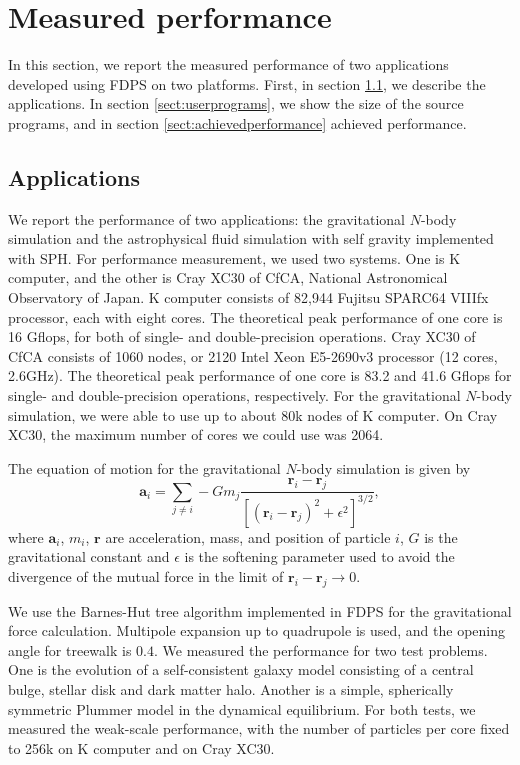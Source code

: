 \documentclass[dvipdfmx]{acm_proc_article-sp}
\begin{document}
\section{Measured performance}


In this section, we report
the measured
performance of two applications developed using FDPS on two
platforms. First, in  section \ref{sect:applications},
we describe the applications. In section
\ref{sect:userprograms}, we show the size of the source programs, and
in section \ref{sect:achievedperformance} achieved performance.



\subsection{Applications}
\label{sect:applications}

We report the performance of two applications: the gravitational
$N$-body simulation and the astrophysical fluid simulation with self
gravity implemented with SPH. For performance measurement, we used two
systems. One is K computer, and the other is Cray XC30 of CfCA,
National Astronomical Observatory of Japan. K computer consists of
82,944 Fujitsu SPARC64 VIIIfx processor, each with
eight cores. The theoretical peak performance of one core is 16
Gflops, for both of single- and double-precision operations. Cray XC30
of CfCA consists of 1060 nodes, or 2120 Intel Xeon E5-2690v3 processor
(12 cores, 2.6GHz). The theoretical peak performance of one core is
83.2 and 41.6 Gflops for single- and double-precision operations,
respectively.  For the gravitational $N$-body simulation, we were able
to use up to about 80k nodes of K computer. On Cray XC30, the maximum
number of cores we could use was 2064.

The equation of motion for the gravitational $N$-body simulation is
given by
\begin{equation}
  \mathbf{a}_i = \sum_{j\ne i} -G m_j\frac{\mathbf{r}_i-\mathbf{r}_j}
  {[(\mathbf{r}_i-\mathbf{r}_j)^2 + \epsilon^2 ]^{3/2}},
\end{equation}  
where $  \mathbf{a}_i$, $m_i$, $\mathbf{r}$ are acceleration,
mass, and position of particle $i$, $G$ is the gravitational constant
and $\epsilon$ is the softening parameter used to avoid the divergence
of the mutual force in the limit of $\mathbf{r}_i-\mathbf{r}_j
\rightarrow 0$.

We use the Barnes-Hut tree algorithm {\cite{1986Natur.324..446B}}
implemented in FDPS for the gravitational force calculation. Multipole
expansion up to quadrupole is used, and the opening angle for treewalk
is $0.4$.  We measured the performance for two test problems. One is
the evolution of a self-consistent galaxy model consisting of a
central bulge, stellar disk and dark matter halo. Another is a simple,
spherically symmetric Plummer model in the dynamical equilibrium. For
both tests, we measured the weak-scale performance, with the number of
particles per core fixed to 256k on K computer and on Cray XC30.
\end{document}
